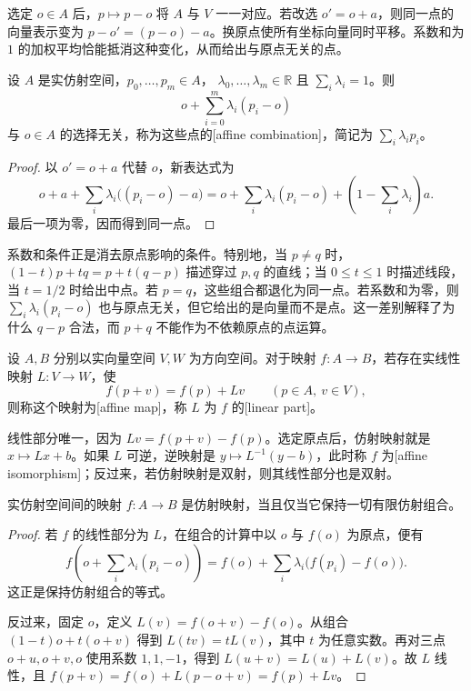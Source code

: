 选定 \(o\in A\) 后，\(p\mapsto p-o\) 将 \(A\) 与 \(V\) 一一对应。若改选 \(o'=o+a\)，则同一点的向量表示变为 \(p-o'=(p-o)-a\)。换原点使所有坐标向量同时平移。系数和为 \(1\) 的加权平均恰能抵消这种变化，从而给出与原点无关的点。

\begin{proposition}\label{g1:prop:affine-combination}
	设 \(A\) 是实仿射空间，\(p_0,\ldots,p_m\in A\)， \(\lambda_0,\ldots,\lambda_m\in\mathbb R\) 且 \(\sum_i\lambda_i=1\)。则
	\[
		o+\sum_{i=0}^m\lambda_i(p_i-o)
	\]
	与 \(o\in A\) 的选择无关，称为这些点的[affine combination]，简记为 \(\sum_i\lambda_i p_i\)。
\end{proposition}
\begin{proof}
	以 \(o'=o+a\) 代替 \(o\)，新表达式为
	\[
		o+a+\sum_i\lambda_i\bigl((p_i-o)-a\bigr)
		=o+\sum_i\lambda_i(p_i-o)+(1-\sum_i\lambda_i)a.
	\]
	最后一项为零，因而得到同一点。
\end{proof}

系数和条件正是消去原点影响的条件。特别地，当 \(p\ne q\) 时，\((1-t)p+tq=p+t(q-p)\) 描述穿过 \(p,q\) 的直线；当 \(0\le t\le1\) 时描述线段，当 \(t=1/2\) 时给出中点。若 \(p=q\)，这些组合都退化为同一点。若系数和为零，则 \(\sum_i\lambda_i(p_i-o)\) 也与原点无关，但它给出的是向量而不是点。这一差别解释了为什么 \(q-p\) 合法，而 \(p+q\) 不能作为不依赖原点的点运算。

\begin{definition}\label{g1:def:affine-map}
	设 \(A,B\) 分别以实向量空间 \(V,W\) 为方向空间。对于映射 \(f:A\rightarrow B\)，若存在实线性映射 \(L:V\rightarrow W\)，使
	\[
		f(p+v)=f(p)+Lv\qquad(p\in A,\ v\in V),
	\]
	则称这个映射为[affine map]，称 \(L\) 为 \(f\) 的[linear part]。
\end{definition}

线性部分唯一，因为 \(Lv=f(p+v)-f(p)\)。选定原点后，仿射映射就是 \(x\mapsto Lx+b\)。如果 \(L\) 可逆，逆映射是 \(y\mapsto L^{-1}(y-b)\)，此时称 \(f\) 为[affine isomorphism]；反过来，若仿射映射是双射，则其线性部分也是双射。

\begin{proposition}\label{g1:prop:affine-preservation}
	实仿射空间间的映射 \(f:A\rightarrow B\) 是仿射映射，当且仅当它保持一切有限仿射组合。
\end{proposition}
\begin{proof}
	若 \(f\) 的线性部分为 \(L\)，在组合的计算中以 \(o\) 与 \(f(o)\) 为原点，便有
	\[
		f\left(o+\sum_i\lambda_i(p_i-o)\right)
		=f(o)+\sum_i\lambda_i\bigl(f(p_i)-f(o)\bigr).
	\]
	这正是保持仿射组合的等式。

	反过来，固定 \(o\)，定义 \(L(v)=f(o+v)-f(o)\)。从组合 \((1-t)o+t(o+v)\) 得到 \(L(tv)=tL(v)\)，其中 \(t\) 为任意实数。再对三点 \(o+u,o+v,o\) 使用系数 \(1,1,-1\)，得到 \(L(u+v)=L(u)+L(v)\)。故 \(L\) 线性，且 \(f(p+v)=f(o)+L(p-o+v)=f(p)+Lv\)。
\end{proof}

